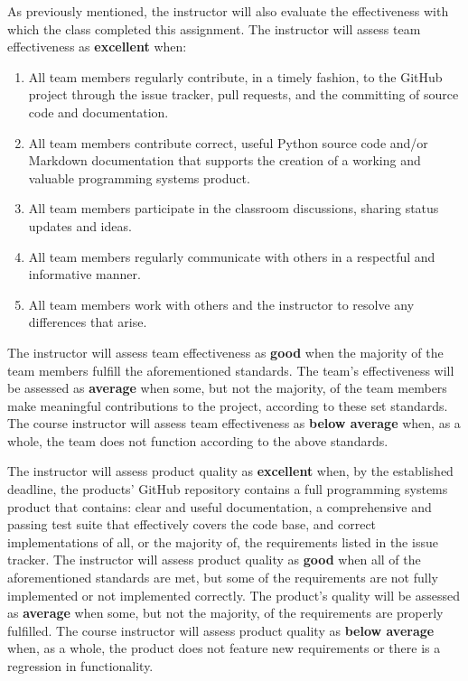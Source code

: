 \documentclass[11pt]{article}
\begin{document}
As previously mentioned, the instructor will also evaluate the effectiveness with which the class completed this
assignment. The instructor will assess team effectiveness as {\bf excellent} when:

\vspace*{-.5em}

\begin{enumerate}
  \setlength{\itemsep}{0pt}

  \item All team members regularly contribute, in a timely fashion, to the GitHub project through the issue tracker,
    pull requests, and the committing of source code and documentation.

  \item All team members contribute correct, useful Python source code and/or Markdown documentation that supports the
    creation of a working and valuable programming systems product.

  \item All team members participate in the classroom discussions, sharing status updates and ideas.

  \item All team members regularly communicate with others in a respectful and informative manner.

  \item All team members work with others and the instructor to resolve any differences that arise.

\end{enumerate}

\vspace*{-.5em}

The instructor will assess team effectiveness as {\bf good} when the majority of the team members fulfill the
aforementioned standards. The team's effectiveness will be assessed as {\bf average} when some, but not the majority, of
the team members make meaningful contributions to the project, according to these set standards. The course instructor
will assess team effectiveness as {\bf below average} when, as a whole, the team does not function according to the
above standards.

The instructor will assess product quality as {\bf excellent} when, by the established deadline, the products' GitHub
repository contains a full programming systems product that contains: clear and useful documentation, a comprehensive
and passing test suite that effectively covers the code base, and correct implementations of all, or the majority of,
the requirements listed in the issue tracker. The instructor will assess product quality as {\bf good} when all of the
aforementioned standards are met, but some of the requirements are not fully implemented or not implemented correctly.
The product's quality will be assessed as {\bf average} when some, but not the majority, of the requirements are
properly fulfilled. The course instructor will assess product quality as {\bf below average} when, as a whole, the
product does not feature new requirements or there is a regression in functionality.
\end{document}
